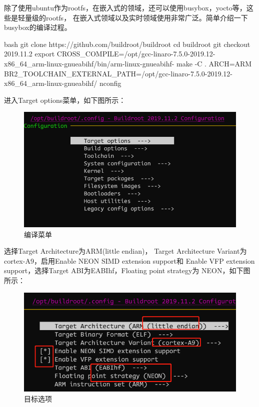 除了使用ubuntu作为rootfs，在嵌入式的领域，还可以使用busybox，yocto等，这些是轻量级的rootfs，
在嵌入式领域以及实时领域使用非常广泛。简单介绍一下busybox的编译过程。
\begin{code-block}{bash}
git clone https://github.com/buildroot/buildroot
cd buildroot
git checkout 2019.11.2
export CROSS_COMPILE=/opt/gcc-linaro-7.5.0-2019.12-x86_64_arm-linux-gnueabihf/bin/arm-linux-gnueabihf-
make -C . ARCH=ARM BR2_TOOLCHAIN_EXTERNAL_PATH=/opt/gcc-linaro-7.5.0-2019.12-x86_64_arm-linux-gnueabihf/
nconfig
\end{code-block}
进入Target options菜单，如下图所示：
\begin{figure}[H]
  \centering
  \includegraphics[width=\linewidth]{buildroot.png}
  \caption{编译菜单}
  \label{fig:buildroot}
\end{figure}
选择Target Architecture为ARM(little endian)，
Target Architecture Variant为cortex-A9，启用Enable NEON SIMD extension support和
Enable VFP extension support，选择Target ABI为EABIhf，Floating point strategy为
NEON，如下图所示：
\begin{figure}[H]
  \centering
  \includegraphics[width=\linewidth]{target_options.png}
  \caption{目标选项}
  \label{fig:target_options}
\end{figure}
